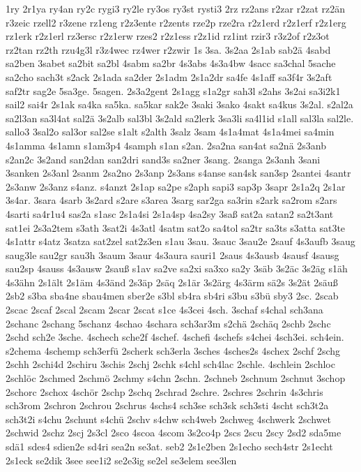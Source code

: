 {1ry
2r1ya
ry4an
ry2c
rygi3
ry2le
ry3os
ry3st
rysti3
2rz
rz2ans
r2zar
r2zat
rz2än
r3zeic
rzell2
r3zene
rz1eng
r2z3ente
r2zents
rze2p
rze2ra
r2z1erd
r2z1erf
r2z1erg
rz1erk
r2z1erl
rz3ersc
r2z1erw
rzes2
r2z1ess
r2z1id
rz1int
rzir3
r3z2of
r2z3ot
rz2tan
rz2th
rzu4g3l
r3z4wec
rz4wer
r2zwir
1s
3sa.
3s2aa
2s1ab
sab2ä
4sabd
sa2ben
3sabet
sa2bit
sa2bl
4sabm
sa2br
4s3abs
4s3a4bw
4sacc
sa3chal
5sache
sa2cho
sach3t
s2ack
2s1ada
sa2der
2s1adm
2s1a2dr
sa4fe
4s1aff
sa3f4r
3s2aft
saf2tr
sag2e
5sa3ge.
5sagen.
2s3a2gent
2s1agg
s1a2gr
sah3l
s2ahs
3s2ai
sa3i2k1
sail2
sai4r
2s1ak
sa4ka
sa5ka.
sa5kar
sak2e
3saki
3sako
4sakt
sa4kus
3s2al.
s2al2a
sa2l3an
sa3l4at
sal2ä
3s2alb
sal3bl
3s2ald
sa2lerk
3sa3li
sa4l1id
s1all
sal3la
sal2le.
sallo3
3sal2o
sal3or
sal2se
s1alt
s2alth
3salz
3sam
4s1a4mat
4s1a4mei
sa4min
4s1amma
4s1amn
s1am3p4
4samph
s1an
s2an.
2sa2na
san4at
sa2nä
2s3anb
s2an2c
3s2and
san2dan
san2dri
sand3s
sa2ner
3sang.
2sanga
2s3anh
3sani
3sanken
2s3anl
2sanm
2sa2no
2s3anp
2s3ans
s4anse
san4sk
san3sp
2santei
4santr
2s3anw
2s3anz
s4anz.
s4anzt
2s1ap
sa2pe
s2aph
sapi3
sap3p
3sapr
2s1a2q
2s1ar
3s4ar.
3sara
4sarb
3s2ard
s2are
s3area
3sarg
sar2ga
sa3rin
s2ark
sa2rom
s2ars
4sarti
sa4r1u4
sas2a
s1asc
2s1a4si
2s1a4sp
4sa2sy
3saß
sat2a
satan2
sa2t3ant
sat1ei
2s3a2tem
s3ath
3sat2i
4s3atl
4satm
sat2o
sa4tol
sa2tr
sa3ts
s3atta
sat3te
4s1attr
s4atz
3satza
sat2zel
sat2z3en
s1au
3sau.
3sauc
3sau2e
2sauf
4s3aufb
3saug
saug3le
sau2gr
sau3h
3saum
3saur
4s3aura
sauri1
2saus
4s3ausb
4sausf
4sausg
sau2sp
4sauss
4s3ausw
2sauß
s1av
sa2ve
sa2xi
sa3xo
sa2y
3säb
3s2äc
3s2äg
s1äh
4s3ähn
2s1ält
2s1äm
4s3änd
2s3äp
2säq
2s1är
3s2ärg
4s3ärm
sä2s
3s2ät
2säuß
2sb2
s3ba
sba4ne
sbau4men
sber2e
s3bl
sb4ra
sb4ri
s3bu
s3bü
sby3
2sc.
2scab
2scac
2scaf
2scal
2scam
2scar
2scat
s1ce
4s3cei
4sch.
3schaf
s4chal
sch3ana
2schanc
2schang
5schanz
4schao
4schara
sch3ar3m
s2chä
2schäq
2schb
2schc
2schd
sch2e
3sche.
4schech
sche2f
4schef.
4schefi
4schefs
s4chei
4sch3ei.
sch4ein.
s2chema
4schemp
sch3erfü
2scherk
sch3erla
3sches
4sches2s
4schex
2schf
2schg
2schh
2schi4d
2schiru
3schis
2schj
2schk
s4chl
sch4lac
2schle.
4schlein
2schloc
2schlöc
2schmed
2schmö
2schmy
s4chn
2schn.
2schneb
2schnum
2schnut
3schop
2schorc
2schox
4schör
2schp
2schq
2schrad
2schre.
2schres
2schrin
4s3chris
sch3rom
2schron
2schrou
2schrus
4schs4
sch3se
sch3sk
sch3sti
4scht
sch3t2a
sch3t2i
s4chu
2schunt
s4chü
2schv
s4chw
sch4web
2schweg
4schwerk
2schwet
2schwid
2schz
2scj
2s3cl
2sco
4scoa
4scom
3s2co4p
2scs
2scu
2scy
2sd2
sda5me
sdä1
sdes4
sdien2e
sd4ri
sea2n
se3at.
seb2
2s1e2ben
2s1echo
sech4str
2s1echt
2s1eck
se2dik
3see
see1i2
se2e3ig
se2el
se3elem
see3len
}
